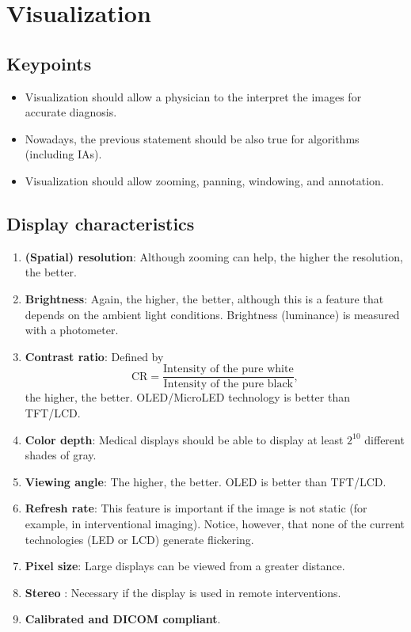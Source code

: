 \chapter{Visualization}

\section{Keypoints}
\begin{itemize}
\item Visualization should allow a physician to the interpret the
  images for accurate diagnosis.
\item Nowadays, the previous statement should be also true for
  algorithms (including IAs).
\item Visualization should allow zooming, panning, windowing, and
  annotation.
\end{itemize}

\section{Display characteristics}
\begin{enumerate}
\item \textbf{(Spatial) resolution}: Although zooming can help, the
  higher the resolution, the better.
\item \textbf{Brightness}: Again, the higher, the better, although
  this is a feature that depends on the ambient light
  conditions. Brightness (luminance) is measured with a photometer.
\item \textbf{Contrast ratio}: Defined by
  \begin{equation}
    \text{CR} = \frac{\text{Intensity~of~the~pure~white}}{\text{Intensity~of~the~pure~black}},
  \end{equation}
  the higher, the better. OLED/MicroLED technology is better than TFT/LCD.
\item \textbf{Color depth}: Medical displays should be able to display
  at least $2^{10}$ different shades of gray.
\item \textbf{Viewing angle}: The higher, the better. OLED is better than TFT/LCD. 
\item \textbf{Refresh rate}: This feature is important if the image is
  not static (for example, in interventional imaging). Notice,
  however, that none of the current technologies (LED or LCD) generate
  flickering.
\item \textbf{Pixel size}: Large displays can be viewed from a greater distance.
\item \textbf{Stereo} \cite{wikipedia_stereoscopy}: Necessary if the
  display is used in remote interventions.
\item \textbf{Calibrated and DICOM compliant}.
\end{enumerate}

